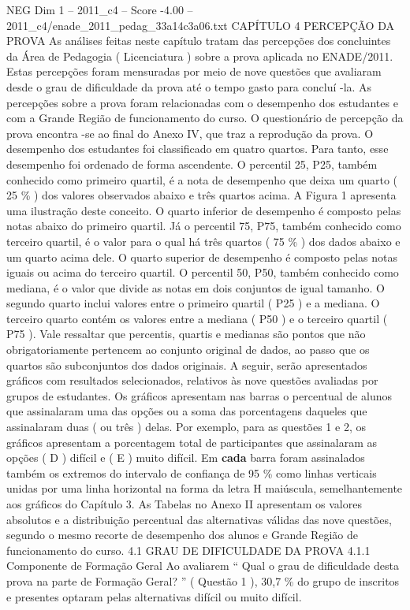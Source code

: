 \begin{textsample}{NEG Dim 1 – 2011\_c4 – Score -4.00 – 2011\_c4/enade\_2011\_pedag\_33a14c3a06.txt}  \label{ex:f1_neg_119}
CAPÍTULO 4 PERCEPÇÃO DA PROVA As análises feitas neste capítulo tratam das percepções dos concluintes da Área de Pedagogia ( Licenciatura ) sobre a prova aplicada no ENADE/2011.
Estas percepções foram mensuradas por meio de nove questões que avaliaram desde o grau de dificuldade da prova até o tempo gasto para concluí -la.
As percepções sobre a prova foram relacionadas com o desempenho dos estudantes e com a Grande Região de funcionamento do curso.
O questionário de percepção da prova encontra -se ao final do Anexo IV, que traz a reprodução da prova.
O desempenho dos estudantes foi classificado em quatro quartos.
Para tanto, esse desempenho foi ordenado de forma ascendente.
O percentil 25, P25, também conhecido como primeiro quartil, é a nota de desempenho que deixa um quarto ( 25 \% ) dos valores observados abaixo e três quartos acima.
A Figura 1 apresenta uma ilustração deste conceito.
O quarto inferior de desempenho é composto pelas notas abaixo do primeiro quartil.
Já o percentil 75, P75, também conhecido como terceiro quartil, é o valor para o qual há três quartos ( 75 \% ) dos dados abaixo e um quarto acima dele.
O quarto superior de desempenho é composto pelas notas iguais ou acima do terceiro quartil.
O percentil 50, P50, também conhecido como mediana, é o valor que divide as notas em dois conjuntos de igual tamanho.
O segundo quarto inclui valores entre o primeiro quartil ( P25 ) e a mediana.
O terceiro quarto contém os valores entre a mediana ( P50 ) e o terceiro quartil ( P75 ).
Vale ressaltar que percentis, quartis e medianas são pontos que não obrigatoriamente pertencem ao conjunto original de dados, ao passo que os quartos são subconjuntos dos dados originais.
A seguir, serão apresentados gráficos com resultados selecionados, relativos às nove questões avaliadas por grupos de estudantes.
Os gráficos apresentam nas barras o percentual de alunos que assinalaram uma das opções ou a soma das porcentagens daqueles que assinalaram duas ( ou três ) delas.
Por exemplo, para as questões 1 e 2, os gráficos apresentam a porcentagem total de participantes que assinalaram as opções ( D ) difícil e ( E ) muito difícil.
Em \textbf{cada} barra foram assinalados também os extremos do intervalo de confiança de 95 \% como linhas verticais unidas por uma linha horizontal na forma da letra H maiúscula, semelhantemente aos gráficos do Capítulo 3.
As Tabelas no Anexo II apresentam os valores absolutos e a distribuição percentual das alternativas válidas das nove questões, segundo o mesmo recorte de desempenho dos alunos e Grande Região de funcionamento do curso. 4.1 GRAU DE DIFICULDADE DA PROVA 4.1.1 Componente de Formação Geral Ao avaliarem “ Qual o grau de dificuldade desta prova na parte de Formação Geral? ” ( Questão 1 ), 30,7 \% do grupo de inscritos e presentes optaram pelas alternativas difícil ou muito difícil.

\end{textsample}
